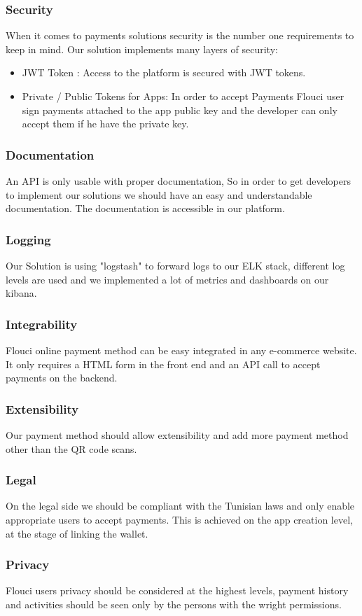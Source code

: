 \begin{spacing}{1.2}
\subsubsection{Security}
When it comes to payments solutions security is the number one requirements to keep in mind.
Our solution implements many layers of security: 
\begin{itemize}
	\item JWT Token : Access to the platform is secured with JWT tokens.
	\item Private / Public Tokens for Apps: In order to accept Payments Flouci user sign payments attached to the app public key and the developer can only accept them if he have the private key.
\end{itemize}
\subsubsection{Documentation}
An API is only usable with proper documentation, So in order to get developers to implement our solutions we should have an easy and understandable documentation. The documentation is accessible in our platform.
\subsubsection{Logging}
Our Solution is using "logstash" to forward logs to our ELK stack, different log levels are used and we implemented a lot of metrics and dashboards on our kibana.
\subsubsection{Integrability}
Flouci online payment method can be easy integrated in any e-commerce website. It only requires a HTML form in the front end and an API call to accept payments on the backend.
\subsubsection{Extensibility}
Our payment method should allow extensibility and add more payment method other than the QR code scans. 
\subsubsection{Legal}
On the legal side we should be compliant with the Tunisian laws and only enable appropriate users to accept payments.
This is achieved on the app creation level, at the stage of linking the wallet.
\subsubsection{Privacy}
Flouci users privacy should be considered at the highest levels, payment history and activities should be seen only by the persons with the wright permissions.

\end{spacing}
